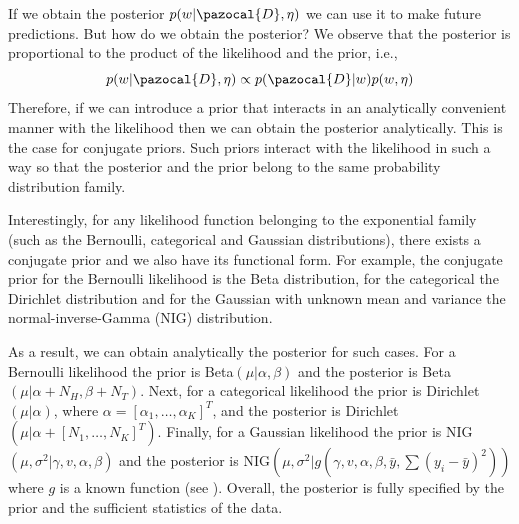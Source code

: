 If we obtain the posterior $p(w|\pazocal{D}, \eta)$ we can use it to make future predictions. 
But how do we obtain the posterior?
We observe that the posterior is proportional to the product of the likelihood and the prior, i.e., 
\begin{equation}
	p(w|\pazocal{D}, \eta) \propto p(\pazocal{D}|w)p(w, \eta)
\end{equation}
Therefore, if we can introduce a prior that interacts in an analytically convenient manner with the likelihood then we can obtain the posterior analytically. 
This is the case for conjugate priors. 
Such priors interact with the likelihood in such a way so that the posterior and the prior belong to the same probability distribution family. 

Interestingly, for any likelihood function belonging to the exponential family (such as the Bernoulli, categorical and Gaussian distributions), there exists a conjugate prior and we also have its functional form.
For example, the conjugate prior for the Bernoulli likelihood is the Beta distribution, for the categorical the Dirichlet distribution and for the Gaussian with unknown mean and variance the normal-inverse-Gamma (NIG) distribution.

As a result, we can obtain analytically the posterior for such cases. 
For a Bernoulli likelihood the prior is Beta$(\mu|\alpha, \beta)$ and the posterior is Beta$(\mu|\alpha+N_H, \beta+N_T)$. 
Next, for a categorical likelihood the prior is Dirichlet$(\mu|\alpha)$, where $\alpha = [\alpha_1,\dots, \alpha_K]^T$, and the posterior is Dirichlet$(\mu|\alpha + [N_1,\dots, N_K]^T)$. 
Finally, for a Gaussian likelihood the prior is NIG$(\mu, \sigma^2|\gamma, v, \alpha, \beta)$ and the posterior is NIG$(\mu, \sigma^2|g(\gamma, v, \alpha, \beta, \bar{y}, \sum(y_i-\bar{y})^2))$ where $g$ is a known function (see \textcite{bishop2006pattern}).
Overall, the posterior is fully specified by the prior and the sufficient statistics of the data. 


